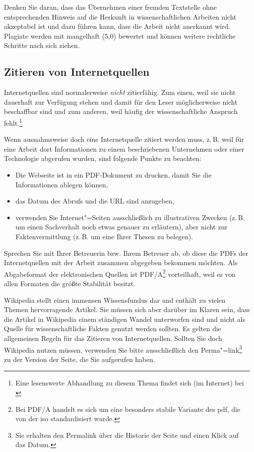 Denken Sie daran, dass das Übernehmen einer fremden Textstelle ohne entsprechenden Hinweis auf die Herkunft in wissenschaftlichen Arbeiten nicht akzeptabel ist und dazu führen kann, dass die Arbeit nicht anerkannt wird. Plagiate werden mit mangelhaft (5,0) bewertet und können weitere rechtliche Schritte nach sich ziehen.


\subsection{Zitieren von Internetquellen}

Internetquellen sind normalerweise \textit{nicht} zitierfähig. Zum einen, weil sie nicht dauerhaft zur Verfügung stehen und damit für den Leser möglicherweise nicht beschaffbar sind und zum anderen, weil häufig der wissenschaftliche Anspruch fehlt.\footnote{Eine lesenswerte Abhandlung zu diesem Thema findet sich (im Internet) bei \cite{Weber2006}}

Wenn ausnahmsweise doch eine Internetquelle zitiert werden muss, z.\,B. weil für eine Arbeit dort Informationen zu einem beschriebenen Unternehmen oder einer Technologie abgerufen wurden, sind folgende Punkte zu beachten:

\begin{itemize}
\item Die Webseite ist in ein PDF-Dokument zu drucken, damit Sie die Informationen ablegen können,
\item das Datum des Abrufs und die URL sind anzugeben,
\item verwenden Sie Internet"=Seiten ausschließlich zu illustrativen Zwecken (z.\,B. um einen Sachverhalt noch etwas genauer zu erläutern), aber nicht zur Faktenvermittlung (z.\,B. um eine Ihrer Thesen zu belegen).
\end{itemize}

Sprechen Sie mit Ihrer Betreuerin bzw. Ihrem Betreuer ab, ob diese die PDFs der Internetquellen mit der Arbeit zusammen abgegeben bekommen möchten. Als Abgabeformat der elektronischen Quellen ist PDF/A\footnote{Bei PDF/A handelt es sich um eine besonders stabile Variante des \gls{pdf}, die von der \gls{iso} standardisiert wurde.} vorteilhaft, weil es von allen Formaten die größte Stabilität besitzt.

Wikipedia stellt einen immensen Wissensfundus dar und enthält zu vielen Themen hervorragende Artikel. Sie müssen sich aber darüber im Klaren sein, dass die Artikel in Wikipedia einem ständigen Wandel unterworfen sind und nicht als Quelle für wissenschaftliche Fakten genutzt werden sollten. Es gelten die allgemeinen Regeln für das Zitieren von Internetquellen. Sollten Sie doch Wikipedia nutzen müssen, verwenden Sie bitte ausschließlich den Perma"=link\footnote{Sie erhalten den Permalink über die Historie der Seite und einen Klick auf das Datum.} zu der Version der Seite, die Sie aufgerufen haben.


